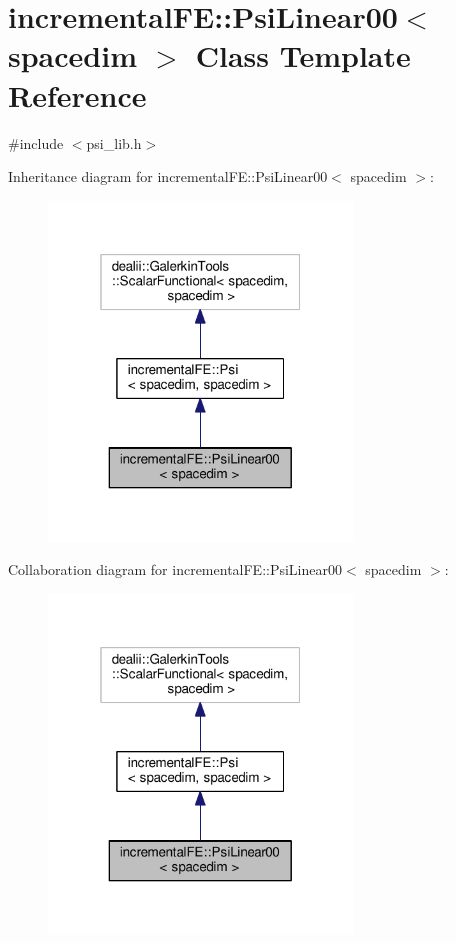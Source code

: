 \hypertarget{classincremental_f_e_1_1_psi_linear00}{}\section{incremental\+FE\+:\+:Psi\+Linear00$<$ spacedim $>$ Class Template Reference}
\label{classincremental_f_e_1_1_psi_linear00}


{\ttfamily \#include $<$psi\+\_\+lib.\+h$>$}



Inheritance diagram for incremental\+FE\+:\+:Psi\+Linear00$<$ spacedim $>$\+:\nopagebreak
\begin{figure}[H]
\begin{center}
\leavevmode
\includegraphics[width=229pt]{classincremental_f_e_1_1_psi_linear00__inherit__graph}
\end{center}
\end{figure}


Collaboration diagram for incremental\+FE\+:\+:Psi\+Linear00$<$ spacedim $>$\+:\nopagebreak
\begin{figure}[H]
\begin{center}
\leavevmode
\includegraphics[width=229pt]{classincremental_f_e_1_1_psi_linear00__coll__graph}
\end{center}
\end{figure}
